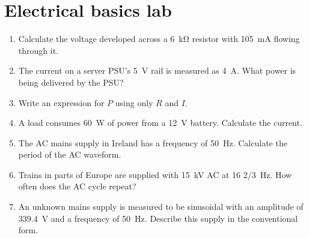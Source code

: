 \chapter{Electrical basics lab}
\label{ch:electrical-basics-lab}

\begin{enumerate}

\item Calculate the voltage developed across a \SI{6}{\kilo\ohm} resistor with \SI{105}{\milli\ampere} flowing through it.

\item The current on a server PSU's \SI{5}{\volt} rail is measured as \SI{4}{\ampere}. What power is being delivered by the PSU?

\item Write an expression for $P$ using only $R$ and $I$.

\item A load consumes \SI{60}{\watt} of power from a \SI{12}{\volt} battery.  Calculate the current.

\item The AC mains supply in Ireland has a frequency of \SI{50}{\hertz}. Calculate the period of the AC waveform.

\item Trains in parts of Europe are supplied with \SI{15}{\kilo\volt} AC at 16 \SI[quotient-mode=fraction]{2/3}{\hertz}. How often does the AC cycle repeat?

\item An unknown mains supply is measured to be sinusoidal with an amplitude of \SI{339.4}{\volt} and a frequency of \SI{50}{\hertz}. Describe this supply in the conventional form.
  
\end{enumerate}
